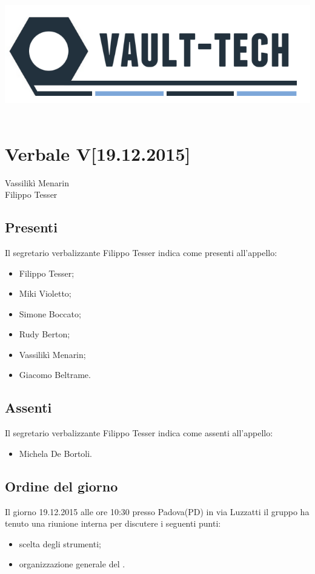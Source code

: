 \documentclass[a4paper]{article}
\def\DATA{19.12.2015}
\def\ORA{10:30}
\def\CITTA{Padova}
\def\PROVINCIA{PD}
\def\VIA{via Luzzatti}
\def\SEGRETARIO{Filippo Tesser}
\def\RESPONSABILE{Vassilikì Menarin}
\begin{document}
\begin{center}
\includegraphics[scale=0.5]{Img/logo.png}\\
\vspace{1cm}
{\Huge \PROGETTO}\\
\vspace{1cm}
\section*{Verbale V[\DATA]}
\end{center}

%
%
 \RESPONSABILE
\\  \SEGRETARIO
\\
\subsection*{Presenti}
Il segretario verbalizzante \SEGRETARIO{} indica come presenti all'appello:
\begin{itemize}
\item Filippo Tesser;
\item Miki Violetto;
\item Simone Boccato;
\item Rudy Berton;
\item Vassilikì Menarin;
\item Giacomo Beltrame.
\end{itemize}

\subsection*{Assenti}
Il segretario verbalizzante \SEGRETARIO{} indica come assenti all'appello:
\begin{itemize}
\item Michela De Bortoli.
\end{itemize}

\subsection*{Ordine del giorno}
Il giorno \DATA{} alle ore \ORA{} presso \CITTA (\PROVINCIA) in \VIA{} il gruppo \AUTORE{} ha tenuto una riunione interna per discutere i seguenti punti:
\begin{itemize}
\item scelta degli strumenti;
\item organizzazione generale del .
\end{itemize}
\end{document}
